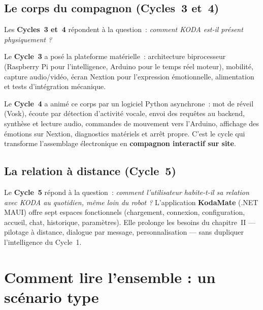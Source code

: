 \documentclass[a4paper,12pt]{report}
\begin{document}
	\subsection{Le corps du compagnon (Cycles~3 et~4)}
	
	Les \textbf{Cycles~3 et~4} répondent à la question~: \emph{comment KODA est-il
	présent physiquement ?}
	
	Le \textbf{Cycle~3} a posé la plateforme matérielle~: architecture biprocesseur
	(Raspberry Pi pour l'intelligence, Arduino pour le temps réel moteur), mobilité,
	capture audio/vidéo, écran Nextion pour l'expression émotionnelle, alimentation et
	tests d'intégration mécanique.
	
	Le \textbf{Cycle~4} a animé ce corps par un logiciel Python asynchrone~: mot de
	réveil (Vosk), écoute par détection d'activité vocale, envoi des requêtes au
	backend, synthèse et lecture audio, commandes de mouvement vers l'Arduino, affichage
	des émotions sur Nextion, diagnostics matériels et arrêt propre. C'est le cycle qui
	transforme l'assemblage électronique en \textbf{compagnon interactif sur site}.
	
	\subsection{La relation à distance (Cycle~5)}
	
	Le \textbf{Cycle~5} répond à la question~: \emph{comment l'utilisateur habite-t-il
	sa relation avec KODA au quotidien, même loin du robot ?} L'application
	\textbf{KodaMate} (.NET MAUI) offre sept espaces fonctionnels (chargement,
	connexion, configuration, accueil, chat, historique, paramètres). Elle prolonge
	les besoins du chapitre~II --- pilotage à distance, dialogue par message,
	personnalisation --- sans dupliquer l'intelligence du Cycle~1.
	
	\section{Comment lire l'ensemble : un scénario type}
	
\end{document}
